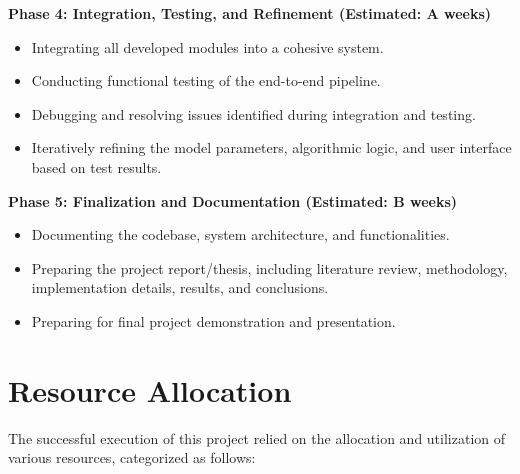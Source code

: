 \begin{description}
    \item \textbf{Phase 4: Integration, Testing, and Refinement (Estimated: A weeks)}
    \begin{itemize}
        \item Integrating all developed modules into a cohesive system.
        \item Conducting functional testing of the end-to-end pipeline.
        \item Debugging and resolving issues identified during integration and testing.
        \item Iteratively refining the model parameters, algorithmic logic, and user interface based on test results.
    \end{itemize}

    \item \textbf{Phase 5: Finalization and Documentation (Estimated: B weeks)}
    \begin{itemize}
        \item Documenting the codebase, system architecture, and functionalities.
        \item Preparing the project report/thesis, including literature review, methodology, implementation details, results, and conclusions.
        \item Preparing for final project demonstration and presentation.
    \end{itemize}
\end{description}


\section{Resource Allocation}
The successful execution of this project relied on the allocation and utilization of various resources, categorized as follows:

